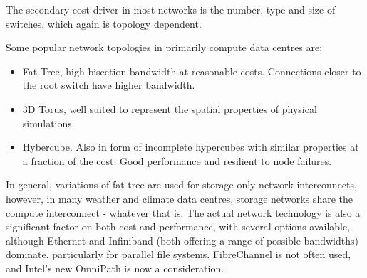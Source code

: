 \documentclass{../../template/esiwace-report}
\begin{document}
The secondary cost driver in most networks is the number, type and size of switches, which again is topology dependent.

Some popular network topologies in primarily compute data centres are:

\begin{itemize}
	\item Fat Tree, high bisection bandwidth at reasonable costs. Connections closer to the root switch have higher bandwidth.
	\item 3D Torus, well suited to represent the spatial properties of physical simulations.
	\item Hybercube. Also in form of incomplete hypercubes with similar properties at a fraction of the cost. Good performance and resilient to node failures.  %
\end{itemize}

In general, variations of fat-tree are used for storage only network interconnects, however, in many weather and climate data centres, storage networks share the compute interconnect - whatever that is. The actual network technology is also a significant factor on both cost and performance, with several options available, although Ethernet and Infiniband  (both offering a range of possible bandwidths) dominate, particularly for parallel file systems.  FibreChannel is not often used, and Intel's new OmniPath is now a consideration.
\end{document}
